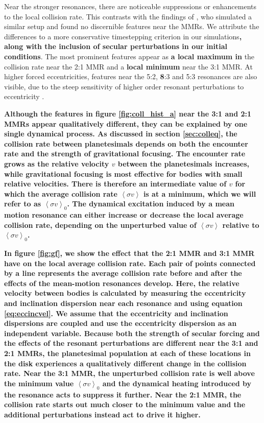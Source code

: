 \documentclass[fleqn,usenatbib]{mnras}
\begin{document}
Near the stronger resonances, there are noticeable suppressions or enhancements to the local collision rate. This contrasts with the findings of 
\citet{2000Icar..143...45R}, who simulated a similar setup and found no discernible features near the MMRs. We attribute the differences to a more 
conservative timestepping criterion in our simulations\textbf{, along with the inclusion of secular perturbations in our initial conditions}. The most prominent features appear as \textbf{a 
local maximum in} the collision rate near the 2:1 MMR and a \textbf{local minimum} near the 3:1 MMR. At higher forced eccentricities, features near the 5:2, \textbf{8}:3 and 5:3 
resonances are also visible, due to the steep sensitivity of higher order resonant perturbations to eccentricity \citep{1994PhyD...77..289M}.

\textbf{Although the features in figure \ref{fig:coll_hist_a} near the 3:1 and 2:1 MMRs appear qualitatively different, they can be explained by one single dynamical process. As discussed in 
section \ref{sec:colleq}, the collision rate between planetesimals depends on both the encounter rate and the strength of gravitational focusing. The encounter rate grows as the relative 
velocity $v$ between the planetesimals increases, while gravitational focusing is most effective for bodies with small relative velocities. There is therefore an intermediate value of $v$ for 
which the average collision rate $\left< \sigma v \right>$ is at a minimum, which we will refer to as  $\left< \sigma v \right>_{0}$. The dynamical excitation induced by a mean motion 
resonance can either increase or decrease the local average collision rate, depending on the unperturbed value of  $\left< \sigma v \right>$ relative to  $\left< \sigma v \right>_{0}$.}

\textbf{In figure \ref{fig:gf}, we show the effect that the 2:1 MMR and 3:1 MMR have on the local average collision rate. Each pair of points connected by a line represents the average 
collision rate before and after the effects of the mean-motion resonances develop. Here, the relative velocity between bodies is calculated by measuring the eccentricity and inclination 
dispersion near each resonance and using equation \ref{eq:eccincvel}. We assume that the eccentricity and inclination dispersions are coupled \citep{1993MNRAS.263..875I} and use the 
eccentricity dispersion as an independent variable. Because both the strength of secular forcing and the effects of the resonant perturbations are different near the 3:1 and 2:1 MMRs, the 
planetesimal population at each of these locations in the disk experiences a qualitatively different change in the collision rate. Near the 3:1 MMR, the unperturbed collision rate is well 
above the minimum value $\left< \sigma v \right>_{0}$ and the dynamical heating introduced by the resonance acts to suppress it further. Near the 2:1 MMR, the collision rate starts out 
much closer to the minimum value and the additional perturbations instead act to drive it higher.}
\end{document}
